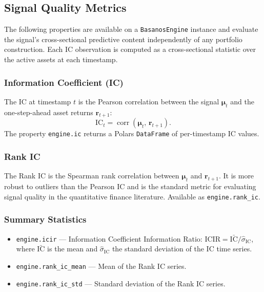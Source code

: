 \documentclass[11pt,a4paper]{article}
\newcommand{\muvec}{\bm{\mu}}
\begin{document}
\subsection{Signal Quality Metrics}
\label{sec:signal_quality}

The following properties are available on a \texttt{BasanosEngine} instance
and evaluate the signal's cross-sectional predictive content independently
of any portfolio construction.  Each IC observation is computed as a
cross-sectional statistic over the active assets at each timestamp.

\subsubsection{Information Coefficient (IC)}

The IC at timestamp $t$ is the Pearson correlation between the signal
$\muvec_t$ and the one-step-ahead asset returns $\mathbf{r}_{t+1}$:
\begin{equation}
  \mathrm{IC}_t = \operatorname{corr}(\muvec_t,\, \mathbf{r}_{t+1}).
\end{equation}
The property \texttt{engine.ic} returns a Polars \texttt{DataFrame} of
per-timestamp IC values.

\subsubsection{Rank IC}

The Rank IC is the Spearman rank correlation between $\muvec_t$ and
$\mathbf{r}_{t+1}$.  It is more robust to outliers than the Pearson IC and
is the standard metric for evaluating signal quality in the quantitative
finance literature.  Available as \texttt{engine.rank\_ic}.

\subsubsection{Summary Statistics}

\begin{itemize}
  \item \texttt{engine.icir} --- Information Coefficient Information Ratio:
    $\mathrm{ICIR} = \bar{\mathrm{IC}} / \hat{\sigma}_\mathrm{IC}$, where
    $\bar{\mathrm{IC}}$ is the mean and $\hat{\sigma}_\mathrm{IC}$ the
    standard deviation of the IC time series.
  \item \texttt{engine.rank\_ic\_mean} --- Mean of the Rank IC series.
  \item \texttt{engine.rank\_ic\_std} --- Standard deviation of the Rank IC
    series.
\end{itemize}
\end{document}
